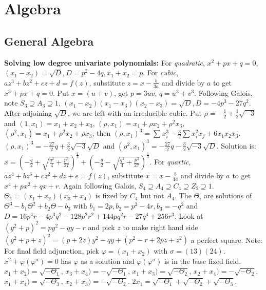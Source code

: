 \section{Algebra}
\subsection{General Algebra}
{\bf Solving low degree univariate polynomials:}
For \emph{quadratic},  $x^2+px+q=0$, $(x_1-x_2)= {\sqrt D}, D= p^2-4q, x_1+x_2=p$.
For \emph{cubic}, $az^3 + bz^2 + cz + d= f(z)$, substitute $z= x - {\frac {b} {3a}}$ and
divide by $a$ to get $x^3+ px+ q= 0$.  Put $x= (u+v)$, get $p=3uv$,
$q= u^3 + v^3$.  Following Galois, note $S_3 \supseteq A_3 \supseteq 1$,
$(x_1 -x_2)(x_1-x_3)(x_2-x_3)= {\sqrt D}, D= -4p^3-27q^2$.  After adjoining
${\sqrt D}$, we are left with an irreducible cubic.  Put $\rho=
-{\frac 1 2} + {\frac 1 2} {\sqrt {-3}}$ and 
$(1,x_1 )= x_1 +x_2 + x_3$, $(\rho, x_1 )= x_1 + \rho x_2 + \rho^2 x_3$,
$(\rho^2, x_1 )= x_1 + \rho^2 x_2 + \rho x_3$, then
$(\rho, x_1 )^3= \sum x_i^3  - {\frac 3 2} \sum x_i^2 x_j + 6 x_1 x_2 x_3$.
$(\rho, x_1 )^3= - {\frac {27} {2}}q + {\frac 3 2} {\sqrt {-3}} {\sqrt {D}}$ and
$(\rho^2, x_1 )^3= - {\frac {27} {2}}q - {\frac 3 2} {\sqrt {-3}} {\sqrt {D}}$.
Solution is:
$x= ({-{\frac {q} {2}} + {\sqrt {{\frac{q^2} {4}} + {\frac {p^3} {27}}}}})^{\frac {1} {3}} +
({-{\frac {q} {2}} - {\sqrt {{\frac{q^2} {4}} + {\frac {p^3} {27}}}}})^{\frac {1} {3}}$.  
For \emph{quartic}, $az^4 + bz^3 + cz^2 + dz+e= f(z)$, 
substitute $x= x - {\frac {b} {4a}}$ and
divide by $a$ to get $x^4+ px^2 + qx + r$.  Again following Galois,
$S_4 \supseteq A_4 \supseteq C_4 \supseteq Z_2 \supseteq 1$.  
$\Theta_1 = (x_1+x_2)(x_3+x_4)$ is fixed by $C_4$ but not $A_4$.
The $\Theta_i$ are solutions of $\Theta^3 -b_1 \Theta^2 + b_2 \Theta -b_3$ with
$b_1= 2p, b_2= p^2-4r, b_3= -q^2$ and
$D=16 p^4r-4p^3q^2-128p^2r^2+144 p q^2r -27 q^4 +256 r^3$.
Look at
$(y^2 + p)^2 = py^2 -qy -r$ and pick $z$ to make right hand side
$(y^2 + p + z)^2 = (p+2z)y^2 -qy + (p^2 -r +2pz + z^2 )$ a perfect square. Note:
For final field adjunction, pick $\varphi= (x_1 +x_2)$ with $\sigma = (13)(24)$.
$x^2+\varphi (\varphi^{\sigma})= 0$ has $\varphi$  as a solution and $\varphi (\varphi^{\sigma})$ is in
the base fixed field.
$x_1 +x_2)= \sqrt{-\Theta_1}$,
$x_3 +x_4)= -\sqrt{-\Theta_1}$,
$x_1 +x_3)= \sqrt{-\Theta_2}$,
$x_2 +x_4)= -\sqrt{-\Theta_2}$,
$x_1 +x_4)= \sqrt{-\Theta_3}$,
$x_2 +x_3)= -\sqrt{-\Theta_2}$.
$2 x_1 = \sqrt{-\Theta_1} + \sqrt{-\Theta_2}+ \sqrt{-\Theta_3}$.
\\
